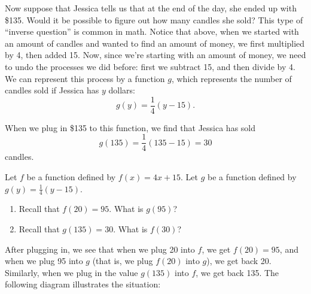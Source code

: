 \documentclass[nooutcomes]{ximera}
\begin{document}
Now suppose that Jessica tells us that at the end of the day, she ended up with \$135. Would it be possible to figure out how many candles she sold? This type of ``inverse question'' is common in math. Notice that above, when we started with an amount of candles and wanted to find an amount of money, we first multiplied by 4, then added 15. Now, since we're starting with an amount of money, we need to undo the processes we did before: first we subtract 15, and then divide by 4.  We can represent this process by a function $g$, which represents the number of candles sold if Jessica has $y$ dollars:
$$
g(y) = \frac{1}{4}(y - 15).
$$

When we plug in \$135 to this function, we find that Jessica has sold
$$
g(135) = \frac{1}{4}(135 - 15) = 30
$$
candles. 

\begin{exploration}
Let $f$ be a function defined by $f(x) = 4x + 15$. Let $g$ be a function defined by $g(y) = \frac{1}{4}(y - 15)$.
\begin{enumerate}[label=\alph*.]
\item Recall that $f(20) = 95$. What is $g(95)$?
\item Recall that $g(135) = 30$. What is $f(30)$?
\end{enumerate}
\end{exploration}

After plugging in, we see that when we plug 20 into $f$, we get $f(20) = 95$, and when we plug 95 into $g$ (that is, we plug $f(20)$ into $g$), we get back 20. Similarly, when we plug in the value $g(135)$ into $f$, we get back 135. The following diagram illustrates the situation:
\begin{image}
\end{image}
\end{document}
